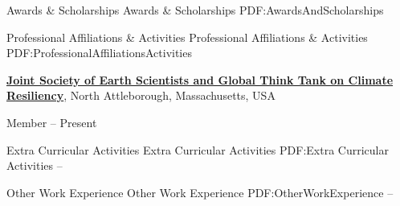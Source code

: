 \documentclass[letterpaper,MMMyyyy,nonstopmode]{simpleresumecv}
\begin{document}
\begin{Body}



\Section
{Awards \&\newline
Scholarships}
{Awards \& Scholarships}
{PDF:AwardsAndScholarships}
\Gap
\BulletItem
{}




\Section
{Professional Affiliations\newline
\& Activities}
{Professional Affiliations \& Activities}
{PDF:ProfessionalAffiliationsActivities}

\Entry
\href{http://www.example.com/my-society}
{\textbf{Joint Society of Earth Scientists and Global Think Tank on Climate Resiliency}},
\newline
North Attleborough, Massachusetts, USA

\Gap
\BulletItem
Member
\hfill
{} --
Present





\Section
{Extra Curricular Activities}
{Extra Curricular Activities}
{PDF:Extra Curricular Activities}
\Entry
{}
\Gap
\BulletItem
{\textbf{}}
\hfill
\DatestampYMD{} --
\DatestampYMD{}
\begin{Detail}
\end{Detail}






\Section
{Other Work\newline
Experience}
{Other Work Experience}
{PDF:OtherWorkExperience}
\Entry
{}
{\textbf{}}
\Gap
\BulletItem
{}
\hfill
{} --
\begin{Detail}
\end{Detail}


\end{Body}
\end{document}
